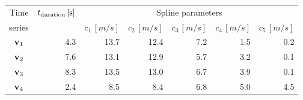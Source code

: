 \begin{tabular}{crrrrrr}
    \toprule
    Time & $\pardt\,[\unit{s}]$ & \multicolumn{5}{c}{Spline parameters} \\
    series & & $c_{1}\,[\unit{m/s}]$ & $c_{2}\,[\unit{m/s}]$ & $c_{3}\,[\unit{m/s}]$ & $c_{4}\,[\unit{m/s}]$ & $c_{5}\,[\unit{m/s}]$ \\\otoprule
    $\textbf{v}_{1}$ & 4.3 & 13.7 & 12.4 & 7.2 & 1.5 & 0.2 \\
    $\textbf{v}_{2}$ & 7.6 & 13.1 & 12.9 & 5.7 & 3.2 & 0.1 \\
    $\textbf{v}_{3}$ & 8.3 & 13.5 & 13.0 & 6.7 & 3.9 & 0.1 \\
    $\textbf{v}_{4}$ & 2.4 & 8.5 & 8.4 & 6.8 & 5.0 & 4.5 \\
    \bottomrule
\end{tabular}

